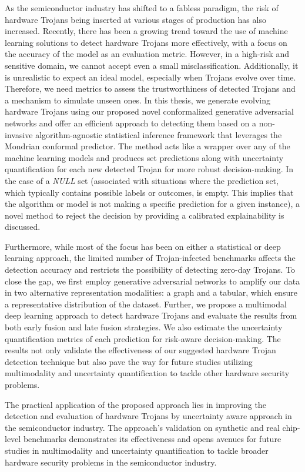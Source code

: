 \begingroup
\RaggedRight

As the semiconductor industry has shifted to a fabless paradigm, the risk of hardware Trojans being inserted at various stages of production has also increased. Recently, there has been a growing trend toward the use of machine learning solutions to detect hardware Trojans more effectively, with a focus on the accuracy of the model as an evaluation metric. However, in a high-risk and sensitive domain, we cannot accept even a small misclassification. Additionally, it is unrealistic to expect an ideal model, especially when Trojans evolve over time. Therefore, we need metrics to assess the trustworthiness of detected Trojans and a mechanism to simulate unseen ones. In this thesis, we generate evolving hardware Trojans using our proposed novel conformalized generative adversarial networks and offer an efficient approach to detecting them based on a non-invasive algorithm-agnostic statistical inference framework that leverages the Mondrian conformal predictor. The method acts like a wrapper over any of the machine learning models and produces set predictions along with uncertainty quantification for each new detected Trojan for more robust decision-making. In the case of a \textit{NULL} set (associated with situations where the prediction set, which typically contains possible labels or outcomes, is empty. This implies that the algorithm or model is not making a specific prediction for a given instance), a novel method to reject the decision by providing a calibrated explainability is discussed. 

Furthermore, while most of the focus has been on either a statistical or deep learning approach, the limited number of Trojan-infected benchmarks affects the detection accuracy and restricts the possibility of detecting zero-day Trojans. To close the gap, we first employ generative adversarial networks to amplify our data in two alternative representation modalities: a graph and a tabular, which ensure a representative distribution of the dataset. Further, we propose a multimodal deep learning approach to detect hardware Trojans and evaluate the results from both early fusion and late fusion strategies. We also estimate the uncertainty quantification metrics of each prediction for risk-aware decision-making. The results not only validate the effectiveness of our suggested hardware Trojan detection technique but also pave the way for future studies utilizing multimodality and uncertainty quantification to tackle other hardware security problems.

The practical application of the proposed approach lies in improving the detection and evaluation of hardware Trojans by uncertainty aware approach in the semiconductor industry. The approach's validation on synthetic and real chip-level benchmarks demonstrates its effectiveness and opens avenues for future studies in multimodality and uncertainty quantification to tackle broader hardware security problems in the semiconductor industry.

\endgroup